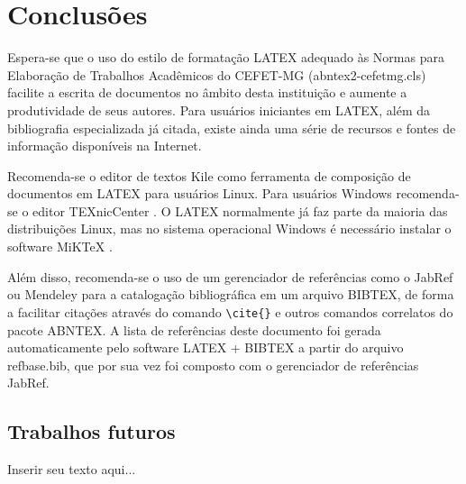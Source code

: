 %
%

\chapter{Conclusões}
\label{chap:conclusoes}

Espera-se que o uso do estilo de formatação LATEX adequado às Normas para Elaboração de Trabalhos Acadêmicos do CEFET-MG ({\ttfamily abntex2-cefetmg.cls}) facilite a escrita de documentos no âmbito desta instituição e aumente a produtividade de seus autores. Para usuários iniciantes em LATEX, além da bibliografia especializada já citada, existe ainda uma série de recursos \cite{CTAN2009} e fontes de informação \cite{TeX-Br2009,Wikibooks2009} disponíveis na Internet.

Recomenda-se o editor de textos Kile como ferramenta de composição de documentos em LATEX para usuários Linux. Para usuários Windows recomenda-se o editor TEXnicCenter \cite{TeXnicCenter2009}. O LATEX normalmente já faz parte da maioria das distribuições Linux, mas no sistema operacional Windows é necessário instalar o software MiKTeX \cite{MiKTeX2009}.

Além disso, recomenda-se o uso de um gerenciador de referências como o JabRef \cite{JabRef2009} ou Mendeley \cite{Mendeley2009} para a catalogação bibliográfica em um arquivo BIBTEX, de forma a facilitar citações através do comando \verb#\cite{}# e outros comandos correlatos do pacote ABNTEX. A lista de referências deste documento foi gerada automaticamente pelo software LATEX + BIBTEX a partir do arquivo {\ttfamily refbase.bib}, que por sua vez foi composto com o gerenciador de referências JabRef.

\section{Trabalhos futuros}
\label{sec:trabalhosFuturos}

Inserir seu texto aqui...
